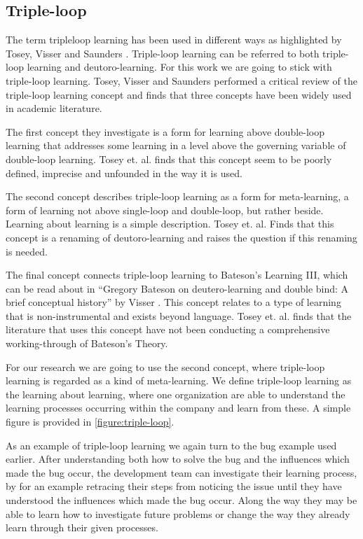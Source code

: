 \subsection{Triple-loop} %
\label{sub:triplloop}
The term tripleloop learning has been used in different ways as highlighted by Tosey, Visser and Saunders \cite{Tosey2011}. Triple-loop learning can be referred to both triple-loop learning and deutoro-learning. For this work we are going to stick with triple-loop learning. Tosey, Visser and Saunders performed a critical review of the triple-loop learning concept and finds that three concepts have been widely used in academic literature. 

The first concept they investigate is a form for learning above double-loop learning that addresses some learning in a level above the governing variable of double-loop learning. Tosey et. al. finds that this concept seem to be poorly defined, imprecise and unfounded in the way it is used. 

The second concept describes triple-loop learning as a form for meta-learning, a form of learning not above single-loop and double-loop, but rather beside. Learning about learning is a simple description. Tosey et. al. Finds that this concept is a renaming of deutoro-learning and raises the question if this renaming is needed. 

The final concept connects triple-loop learning to Bateson's Learning III, which can be read about in ``Gregory Bateson on deutero-learning and double bind: A brief conceptual history'' by Visser \cite{Visser2003}. This concept relates to a type of learning that is non-instrumental and exists beyond language. Tosey et. al. finds that the literature that uses this concept have not been conducting a comprehensive working-through of Bateson's Theory. 

For our research we are going to use the second concept, where triple-loop learning is regarded as a kind of meta-learning. We define triple-loop learning as the learning about learning, where one organization are able to understand the learning processes occurring within the company and learn from these. A simple figure is provided in \autoref{figure:triple-loop}.

As an example of triple-loop learning we again turn to the bug example used earlier. After understanding both how to solve the bug and the influences which made the bug occur, the development team can investigate their learning process, by for an example retracing their steps from noticing the issue until they have understood the influences which made the bug occur. Along the way they may be able to learn how to investigate future problems or change the way they already learn through their given processes. 

